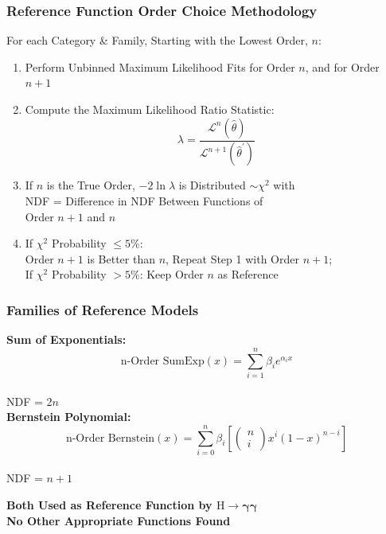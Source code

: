 \documentclass{beamer}
\begin{document}
\begin{frame}[label=refSelectionMethod]
\frametitle{Reference Function Order Choice Methodology}
  For each Category \& Family, Starting with the Lowest Order, $n$:
\small
  \begin{enumerate}
    \item Perform Unbinned Maximum Likelihood Fits for Order $n$, and for Order $n+1$
    \item Compute the Maximum Likelihood Ratio Statistic:
    \[ \lambda = \frac{\mathcal{L}^{n}(\hat{\theta})}{\mathcal{L}^{n+1}( \hat{\theta}^{'} )}\]
    \item If $n$ is the True Order, $-2\ln\lambda$ is Distributed $\sim \chi^2$ with \\ NDF = Difference in NDF Between Functions of \\ Order $n+1$ and $n$
    \item If $\chi^2$ Probability $\leq5\%$: 
        \\Order $n+1$ is Better than $n$, Repeat Step 1 with Order $n+1$;
        \\ If $\chi^2$ Probability $>5\%$: Keep Order $n$ as Reference
  \end{enumerate}
\end{frame}

\begin{frame}
\frametitle{Families of Reference Models}
\textbf{Sum of Exponentials:}
\\
\[ \mbox{n-Order SumExp}(x) = \sum^n_{i=1}\beta_i e^{\alpha_i x}\]
\\
\hspace{6.5em} NDF = 2$n$
\vspace{1ex}
\\
\textbf{Bernstein Polynomial:}
\[ 
\mbox{n-Order Bernstein}(x) = \sum^n_{i=0}\beta_i 
\left[
\left( \begin{array}{cc}
n \\ i
\end{array} \right)
x^i(1-x)^{n-i}
\right]
\]
\\
\hspace{6.5em} NDF = $n+1$
\\
\begin{center}
\textbf{
Both Used as Reference Function by $\bm{\mathrm{H} \rightarrow \gamma\gamma}$
\\
No Other Appropriate Functions Found
}
\end{center}

\end{frame}
\end{document}

